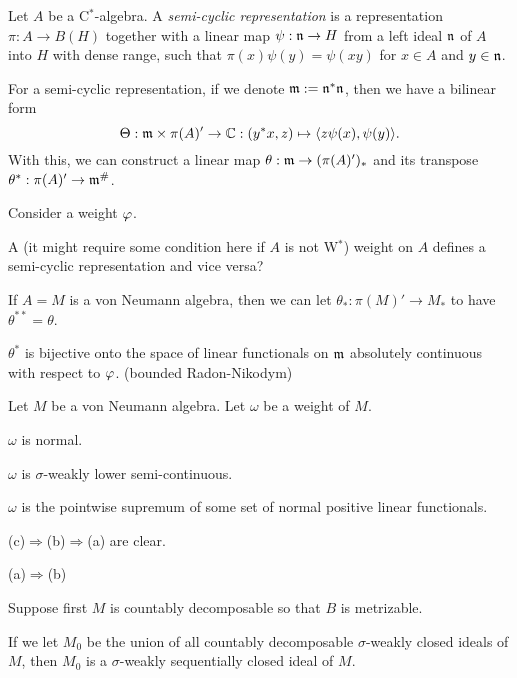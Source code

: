 \documentclass{../../large}
\begin{document}
\begin{prb}
Let $A$ be a C$^*$-algebra.
A \emph{semi-cyclic representation} is a representation $\pi:A\to B(H)$ together with a linear map $\psi:\mathfrak{n}\to H$ from a left ideal $\mathfrak{n}$ of $A$ into $H$ with dense range, such that $\pi(x)\psi(y)=\psi(xy)$ for $x\in A$ and $y\in\mathfrak{n}$.

For a semi-cyclic representation, if we denote $\mathfrak{m}:=\mathfrak{n}^*\mathfrak{n}$, then we have a bilinear form
\[\Theta:\mathfrak{m}\times\pi(A)'\to\mathbb{C}:(y^*x,z)\mapsto\langle z\psi(x),\psi(y)\rangle.\]
With this, we can construct a linear map $\theta:\mathfrak{m}\to(\pi(A)')_*$ and its transpose $\theta^*:\pi(A)'\to\mathfrak{m}^\#$.

Consider a weight $\varphi$.
\begin{parts}
\item A (it might require some condition here if $A$ is not W$^*$) weight on $A$ defines a semi-cyclic representation and vice versa?
\item If $A=M$ is a von Neumann algebra, then we can let $\theta_*:\pi(M)'\to M_*$ to have $\theta^{**}=\theta$.
\item $\theta^*$ is bijective onto the space of linear functionals on $\mathfrak{m}$ absolutely continuous with respect to $\varphi$. (bounded Radon-Nikodym)
\item 
\end{parts}
\end{prb}



\begin{prb}
Let $M$ be a von Neumann algebra.
Let $\omega$ be a weight of $M$.
\begin{parts}
\item $\omega$ is normal.
\item $\omega$ is $\sigma$-weakly lower semi-continuous.
\item $\omega$ is the pointwise supremum of some set of normal positive linear functionals.
\end{parts}
\end{prb}
\begin{pf}
(c)$\Rightarrow$(b)$\Rightarrow$(a) are clear.

(a)$\Rightarrow$(b)


Suppose first $M$ is countably decomposable so that $B$ is metrizable.




\end{pf}

If we let $M_0$ be the union of all countably decomposable $\sigma$-weakly closed ideals of $M$, then $M_0$ is a $\sigma$-weakly sequentially closed ideal of $M$.
\end{document}
